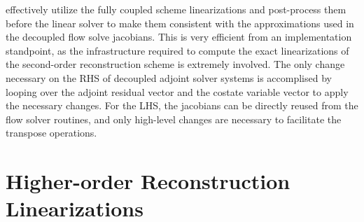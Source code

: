  effectively utilize the
fully coupled scheme linearizations and post-process them before the linear
solver to make them consistent with the approximations used in the decoupled
flow solve jacobians.  This is very efficient from an implementation standpoint,
as the infrastructure required to compute the exact linearizations of the
second-order reconstruction scheme is extremely involved.  The only change
necessary on the RHS of decoupled adjoint solver systems is accomplised by
looping over the adjoint residual vector and the costate variable vector to
apply the necessary changes.  For the LHS, the jacobians can be directly reused
from the flow solver routines, and only high-level changes are necessary to
facilitate the transpose operations.


\section{Higher-order Reconstruction Linearizations}
\label{sec:higher-order-linearizations}

